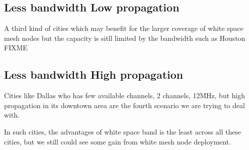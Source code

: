 \subsection{Less bandwidth Low propagation}
A third kind of cities which may benefit for the larger coverage of white space mesh nodes but the capacity is sitll limited by the bandwidth such as Houston FIXME



\subsection{Less bandwidth High propagation}
Cities like Dallas who has few available channels, 2 channels, 12MHz, but high propagation in its downtown area are the fourth scenario we are trying to deal with.

In such cities, the advantages of white space band is the least across all these cities, but we still could see some gain from white mesh node deployment.




